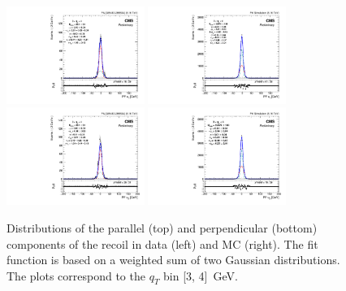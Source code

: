 \begin{figure}
 \begin{center}
  \includegraphics[width=0.4\textwidth]{Figures/WBoson/Analysis/Correction/Recoil/RecoilFits/Data/pfu1fit_2.pdf}
  \includegraphics[width=0.4\textwidth]{Figures/WBoson/Analysis/Correction/Recoil/RecoilFits/MC/pfu1fit_2.pdf} \\
  \includegraphics[width=0.4\textwidth]{Figures/WBoson/Analysis/Correction/Recoil/RecoilFits/Data/pfu2fit_2.pdf}
  \includegraphics[width=0.4\textwidth]{Figures/WBoson/Analysis/Correction/Recoil/RecoilFits/MC/pfu2fit_2.pdf}
  \caption{Distributions of the parallel (top) and perpendicular (bottom) components of the recoil in data (left) and MC (right). The fit function is based on a weighted sum of two Gaussian distributions. The plots correspond to the $q_{T}$ bin [3, 4]~GeV.}
 \label{fig:RecoilFits}
 \end{center}
\end{figure}
 
